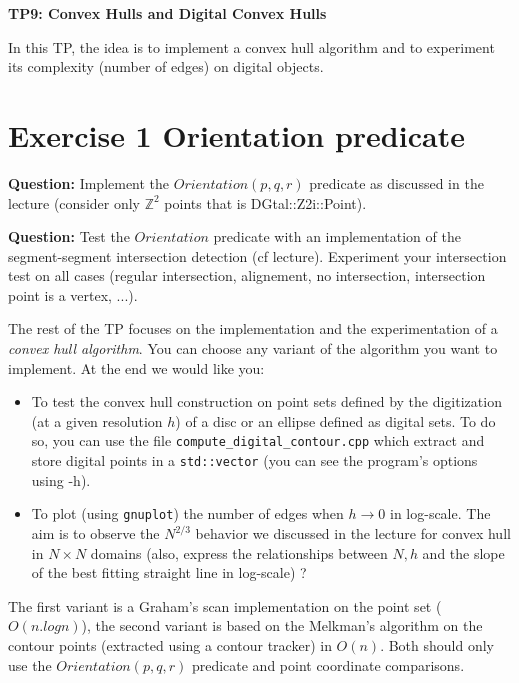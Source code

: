 \documentclass[a4paper, 11pt]{article}
\title{}
\author{}
\date{}
\begin{document}
\begin{center}
	\LARGE \textbf{TP9: Convex Hulls and Digital Convex Hulls}
\end{center}

\bigskip
\par In this TP, the idea is to implement a convex hull algorithm and to experiment its complexity (number of edges) on digital objects.

\section*{Exercise 1 \rm Orientation predicate}

{\bf Question:} Implement the $Orientation(p,q,r)$ predicate as discussed in the lecture (consider only $\mathbb{Z}^2$ points that is DGtal::Z2i::Point).

\noindent
{\bf Question:} Test the $Orientation$ predicate with an implementation of the segment-segment intersection detection (cf lecture). 
Experiment your intersection test on all cases (regular intersection, alignement, no intersection, intersection point is a vertex, ...).

\bigskip
\bigskip
\bigskip

\par The rest of the TP focuses on the implementation and the experimentation of a \emph{convex hull algorithm}. 
    You can choose any variant of the algorithm you want to implement. At the end we would like you:
	\begin{itemize}
	\item To test the convex hull construction on point sets defined by the digitization (at a given resolution $h$) of a disc or an ellipse defined as digital sets.
        To do so, you can use the file \texttt{compute\_digital\_contour.cpp} which extract and store digital points in a \texttt{std::vector} (you can see the program's options using -h).
	\item To plot (using \texttt{gnuplot}) the number of edges when $h\rightarrow 0$ in log-scale. 
        The aim is to observe the $N^{2/3}$ behavior we discussed in the lecture for convex hull in $N\times N$ 
            domains (also, express the relationships between $N, h$ and the slope of the best fitting straight line in log-scale) ?
	\end{itemize}

\par The first variant is a Graham's scan implementation on the point set ($O(n.logn)$), the second variant is based on the Melkman's algorithm on the contour points 
(extracted using a contour tracker) in $O(n)$. Both should only use the $Orientation(p,q,r)$ predicate and point coordinate comparisons.
\end{document}
